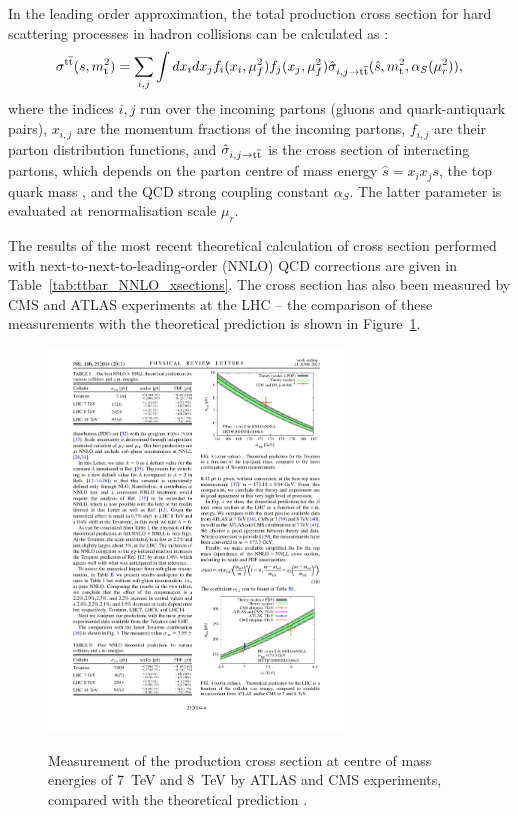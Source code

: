 In the leading order approximation, the total \ttbar production cross section for hard scattering processes in hadron
collisions can be calculated as \autocite{Sterman1986, primer_LHC}:
\begin{equation}
\sigma^{\mathrm{t}\overline{\mathrm{t}}} (s,m_\mathrm{t}^2) = \sum_{i,j} \int dx_i dx_j f_i(x_i, \mu_f^2) f_j(x_j,\mu_f^2) \hat{\sigma}_{i,j
\rightarrow \mathrm{t}\overline{\mathrm{t}}} (\hat{s}, m_\mathrm{t}^2, \alpha_S(\mu_r^2)),
\end{equation}
where the indices $i,j$ run over the incoming partons (gluons and quark-antiquark pairs), $x_{i,j}$ are the momentum
fractions of the incoming partons, $f_{i,j}$ are their parton distribution functions, and $\hat{\sigma}_{i,j
\rightarrow \mathrm{t}\overline{\mathrm{t}}}$ is the cross section of interacting partons, which depends on the parton centre of mass energy
$\hat{s} = x_i x_j s$, the top quark mass \mtop, and the QCD strong coupling constant $\alpha_S$. The latter parameter
is evaluated at renormalisation scale $\mu_r$. %

The results of the most recent theoretical calculation of \ttbar cross section performed with
next-to-next-to-leading-order (NNLO) QCD corrections \autocite{NNLO_ttbar} are given in
Table~\ref{tab:ttbar_NNLO_xsections}. The cross section has also been measured by CMS and ATLAS experiments at the LHC
-- the comparison of these measurements with the theoretical prediction is shown in
Figure~\ref{fig:xsections_comparison_NNLO}.



\begin{figure}[!hbtp]
   \centering
   {\includegraphics[width=0.7\textwidth]{xsections_comparison_NNLO}}
   \caption[Measurement of the \ttbar production cross section]{Measurement of the \ttbar production cross section at
   centre of mass energies of \SI{7}{\TeV} and \SI{8}{\TeV} by ATLAS and CMS experiments, compared with the theoretical
   prediction \autocite{NNLO_ttbar}.}
   \label{fig:xsections_comparison_NNLO}
\end{figure}

